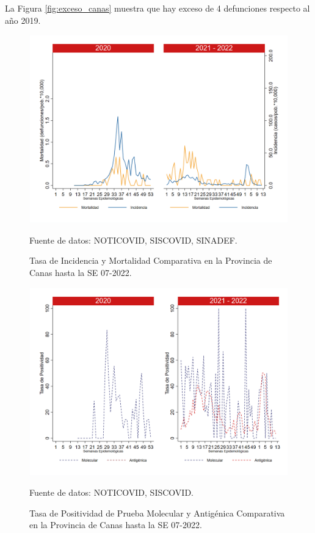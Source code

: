 \documentclass[12pt,a4paper,openany]{book}
\begin{document}
		La Figura \ref{fig:exceso_canas} muestra que hay exceso de 4 defunciones respecto al año 2019.
		
		\begin{figure}[h]
			\caption{Tasa de Incidencia y Mortalidad Comparativa en la Provincia de Canas hasta la SE 07-2022.}\label{fig:inc_mort_canas}
			\begin{center}
				\includegraphics[width=0.85\linewidth]{../figuras/incidencia_mortalidad_20_21_3.png}
			\end{center}
			{\footnotesize {Fuente de datos: NOTICOVID, SISCOVID, SINADEF.}}
		\end{figure}
		
		\begin{figure}[h]
			\caption{Tasa de Positividad de Prueba Molecular y Antigénica Comparativa en la Provincia de Canas hasta la SE 07-2022.}\label{fig:positividad_canas}
			\begin{center}
				\includegraphics[width=0.7\linewidth]{../figuras/positividad_20_21_3.png}
			\end{center}
			{\footnotesize {Fuente de datos: NOTICOVID, SISCOVID.}}
		\end{figure}
		
\end{document}
